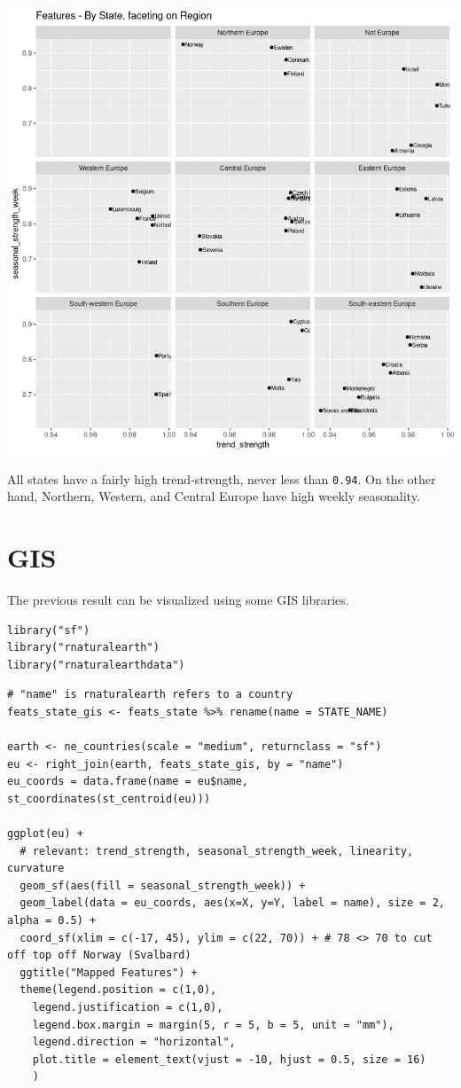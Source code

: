 \documentclass[8pt]{article}
\begin{document}
\begin{center}
\includegraphics[width=.9\linewidth]{./media/feat_state.png}
\end{center}

All states have a fairly high trend-strength, never less than \texttt{0.94}. On the other hand, Northern, Western, and Central Europe have high weekly seasonality.

\begin{latex}
\pagebreak
\end{latex}
\section{GIS}
\label{sec:org09651cf}
The previous result can be visualized using some GIS libraries.

\begin{verbatim}
library("sf")
library("rnaturalearth")
library("rnaturalearthdata")
\end{verbatim}

\begin{verbatim}
# "name" is rnaturalearth refers to a country
feats_state_gis <- feats_state %>% rename(name = STATE_NAME)

earth <- ne_countries(scale = "medium", returnclass = "sf")
eu <- right_join(earth, feats_state_gis, by = "name")
eu_coords = data.frame(name = eu$name, st_coordinates(st_centroid(eu)))

ggplot(eu) +
  # relevant: trend_strength, seasonal_strength_week, linearity, curvature
  geom_sf(aes(fill = seasonal_strength_week)) +
  geom_label(data = eu_coords, aes(x=X, y=Y, label = name), size = 2, alpha = 0.5) +
  coord_sf(xlim = c(-17, 45), ylim = c(22, 70)) + # 78 <> 70 to cut off top off Norway (Svalbard)
  ggtitle("Mapped Features") +
  theme(legend.position = c(1,0),
	legend.justification = c(1,0),
	legend.box.margin = margin(5, r = 5, b = 5, unit = "mm"),
	legend.direction = "horizontal",
	plot.title = element_text(vjust = -10, hjust = 0.5, size = 16)
	)
\end{verbatim}
\end{document}
